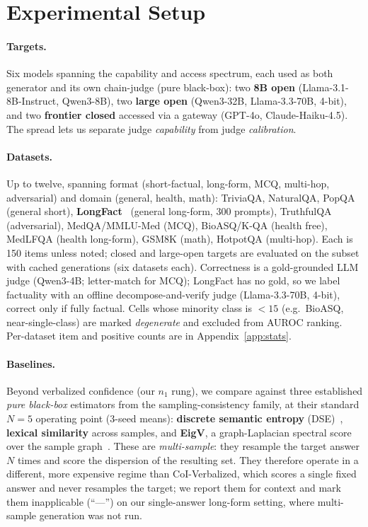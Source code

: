 \documentclass[11pt]{article}
\begin{document}
\section{Experimental Setup}\label{sec:setup}
\paragraph{Targets.} Six models spanning the capability and access spectrum, each used as
both generator and its own chain-judge (pure black-box): two \textbf{8B open}
(Llama-3.1-8B-Instruct, Qwen3-8B), two \textbf{large open} (Qwen3-32B, Llama-3.3-70B,
4-bit), and two \textbf{frontier closed} accessed via a gateway (GPT-4o, Claude-Haiku-4.5).
The spread lets us separate judge \emph{capability} from judge \emph{calibration}.

\paragraph{Datasets.} Up to twelve, spanning format (short-factual, long-form, MCQ,
multi-hop, adversarial) and domain (general, health, math): TriviaQA, NaturalQA, PopQA
(general short), \textbf{LongFact}~\citep{wei2024longfact} (general long-form, 300 prompts),
TruthfulQA (adversarial), MedQA/MMLU-Med (MCQ), BioASQ/K-QA (health free), MedLFQA (health
long-form), GSM8K (math), HotpotQA (multi-hop). Each is 150 items unless noted; closed and
large-open targets are evaluated on the subset with cached generations (six datasets each).
Correctness is a gold-grounded LLM judge (Qwen3-4B; letter-match for MCQ); LongFact has no
gold, so we label factuality with an offline decompose-and-verify judge (Llama-3.3-70B,
4-bit), correct only if fully factual. Cells whose minority class is $<15$ (e.g.\ BioASQ,
near-single-class) are marked \emph{degenerate} and excluded from AUROC ranking. Per-dataset
item and positive counts are in Appendix~\ref{app:stats}.

\paragraph{Baselines.} Beyond verbalized confidence (our $n_1$ rung), we compare against
three established \emph{pure black-box} estimators from the sampling-consistency family,
at their standard $N{=}5$ operating point (3-seed means): \textbf{discrete semantic
entropy} (DSE)~\citep{kuhn2023semantic}, \textbf{lexical similarity} across
samples, and \textbf{EigV}, a graph-Laplacian spectral score over the sample
graph~\citep{lin2024generating}. These are \emph{multi-sample}: they resample the target
answer $N$ times and score the dispersion of the resulting set. They therefore operate in
a different, more expensive regime than CoI-Verbalized, which scores a single fixed answer
and never resamples the target; we report them for context and mark them inapplicable
(``---'') on our single-answer long-form setting, where multi-sample generation was not run.
\end{document}

